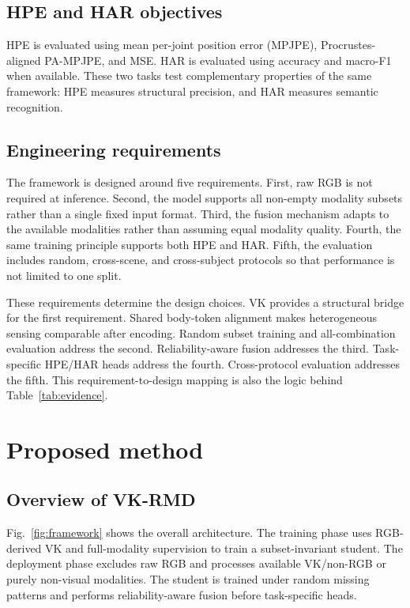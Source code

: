 \documentclass[preprint,12pt]{elsarticle}
\newcommand{\method}{VK-RMD}
\newcommand{\mpjpe}{MPJPE}
\newcommand{\pampjpe}{PA-MPJPE}
\begin{document}
\subsection{HPE and HAR objectives}

HPE is evaluated using mean per-joint position error (\mpjpe{}), Procrustes-aligned \pampjpe{}, and MSE. HAR is evaluated using accuracy and macro-F1 when available. These two tasks test complementary properties of the same framework: HPE measures structural precision, and HAR measures semantic recognition.

\subsection{Engineering requirements}

The framework is designed around five requirements. First, raw RGB is not required at inference. Second, the model supports all non-empty modality subsets rather than a single fixed input format. Third, the fusion mechanism adapts to the available modalities rather than assuming equal modality quality. Fourth, the same training principle supports both HPE and HAR. Fifth, the evaluation includes random, cross-scene, and cross-subject protocols so that performance is not limited to one split.

These requirements determine the design choices. VK provides a structural bridge for the first requirement. Shared body-token alignment makes heterogeneous sensing comparable after encoding. Random subset training and all-combination evaluation address the second. Reliability-aware fusion addresses the third. Task-specific HPE/HAR heads address the fourth. Cross-protocol evaluation addresses the fifth. This requirement-to-design mapping is also the logic behind Table~\ref{tab:evidence}.

\section{Proposed method}

\subsection{Overview of \method}

Fig.~\ref{fig:framework} shows the overall architecture. The training phase uses RGB-derived VK and full-modality supervision to train a subset-invariant student. The deployment phase excludes raw RGB and processes available VK/non-RGB or purely non-visual modalities. The student is trained under random missing patterns and performs reliability-aware fusion before task-specific heads.
\end{document}
